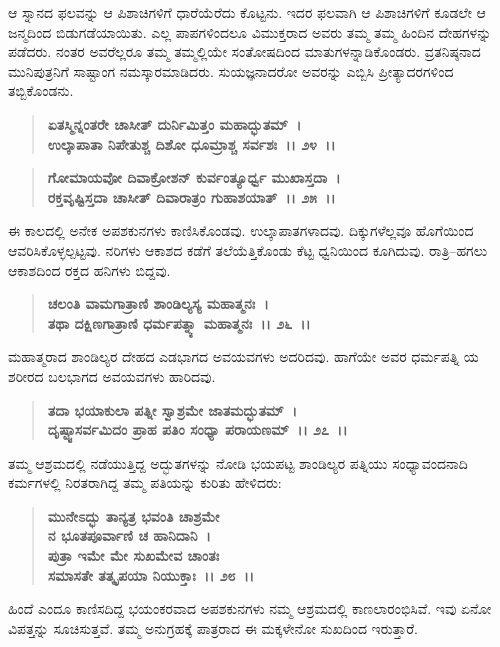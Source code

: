 ಆ ಸ್ನಾನದ ಫಲವನ್ನು ಆ ಪಿಶಾಚಿಗಳಿಗೆ ಧಾರೆಯೆರೆದು ಕೊಟ್ಟನು. ಇದರ ಫಲವಾಗಿ ಆ ಪಿಶಾಚಿಗಳಿಗೆ ಕೂಡಲೇ ಆ ಜನ್ಮದಿಂದ ಬಿಡುಗಡೆಯಾಯಿತು. ಎಲ್ಲ ಪಾಪಗಳಿಂದಲೂ ವಿಮುಕ್ತರಾದ ಅವರು ತಮ್ಮ ತಮ್ಮ ಹಿಂದಿನ ದೇಹಗಳನ್ನು ಪಡೆದರು. ನಂತರ ಅವರೆಲ್ಲರೂ ತಮ್ಮ ತಮ್ಮಲ್ಲಿಯೇ ಸಂತೋಷದಿಂದ ಮಾತುಗಳನ್ನಾಡಿಕೊಂಡರು. ವ್ರತನಿಷ್ಠನಾದ ಮುನಿಪುತ್ರನಿಗೆ ಸಾಷ್ಟಾಂಗ ನಮಸ್ಕಾರಮಾಡಿದರು. ಸುಯಜ್ಞನಾದರೋ ಅವರನ್ನು ಎಬ್ಬಿಸಿ ಪ್ರೀತ್ಯಾದರಗಳಿಂದ ತಬ್ಬಿಕೊಂಡನು.

\begin{verse}
\textbf{ಏತಸ್ಮಿನ್ನಂತರೇ ಚಾಸೀತ್ ದುರ್ನಿಮಿತ್ತಂ ಮಹಾದ್ಭುತಮ್~।}\\\textbf{ಉಲ್ಕಾಪಾತಾ ನಿಪೇತುಶ್ಚ ದಿಶೋ ಧೂಮ್ರಾಶ್ಚ ಸರ್ವಶಃ~।। ೨೪~।। }
\end{verse}

\begin{verse}
\textbf{ಗೋಮಾಯವೋ ದಿವಾಕ್ರೋಶನ್ ಕುರ್ವಂತ್ಯೂರ್ಧ್ವ ಮುಖಾಸ್ತದಾ~।}\\\textbf{ರಕ್ತವೃಷ್ಟಿಸ್ತದಾ ಚಾಸೀತ್ ದಿವಾರಾತ್ರಂ ಗುಹಾಶಯಾತ್~।। ೨೫~।।}
\end{verse}

ಈ ಕಾಲದಲ್ಲಿ ಅನೇಕ ಅಪಶಕುನಗಳು ಕಾಣಿಸಿಕೊಂಡವು. ಉಲ್ಕಾಪಾತಗಳಾದವು. ದಿಕ್ಕುಗಳೆಲ್ಲವೂ ಹೊಗೆಯಿಂದ ಆವರಿಸಿಕೊಳ್ಳಲ್ಪಟ್ಟವು. ನರಿಗಳು ಆಕಾಶದ ಕಡೆಗೆ ತಲೆಯೆತ್ತಿಕೊಂಡು ಕೆಟ್ಟ ಧ್ವನಿಯಿಂದ ಕೂಗಿದುವು. ರಾತ್ರಿ–ಹಗಲು ಆಕಾಶದಿಂದ ರಕ್ತದ ಹನಿಗಳು ಬಿದ್ದವು.

\begin{verse}
\textbf{ಚಲಂತಿ ವಾಮಗಾತ್ರಾಣಿ ಶಾಂಡಿಲ್ಯಸ್ಯ ಮಹಾತ್ಮನಃ~।}\\\textbf{ತಥಾ ದಕ್ಷಿಣಗಾತ್ರಾಣಿ ಧರ್ಮಪತ್ನ್ಯಾ ಮಹಾತ್ಮನಃ~।। ೨೬~।।}
\end{verse}

ಮಹಾತ್ಮರಾದ ಶಾಂಡಿಲ್ಯರ ದೇಹದ ಎಡಭಾಗದ ಅವಯವಗಳು ಅದರಿದವು. ಹಾಗೆಯೇ ಅವರ ಧರ್ಮಪತ್ನಿ ಯ ಶರೀರದ ಬಲಭಾಗದ ಅವಯವಗಳು ಹಾರಿದವು.

\begin{verse}
\textbf{ತದಾ ಭಯಾಕುಲಾ ಪತ್ನೀ ಸ್ವಾಶ್ರಮೇ ಜಾತಮದ್ಭುತಮ್~।}\\\textbf{ದೃಷ್ಟ್ವಾಸರ್ವಮಿದಂ ಪ್ರಾಹ ಪತಿಂ ಸಂಧ್ಯಾ ಪರಾಯಣಮ್~।। ೨೭~।।}
\end{verse}

ತಮ್ಮ ಆಶ್ರಮದಲ್ಲಿ ನಡೆಯುತ್ತಿದ್ದ ಅದ್ಭುತಗಳನ್ನು ನೋಡಿ ಭಯಪಟ್ಟ ಶಾಂಡಿಲ್ಯರ ಪತ್ನಿಯು ಸಂಧ್ಯಾವಂದನಾದಿ ಕರ್ಮಗಳಲ್ಲಿ ನಿರತರಾಗಿದ್ದ ತಮ್ಮ ಪತಿಯನ್ನು ಕುರಿತು ಹೇಳಿದರು:

\begin{verse}
\textbf{ಮುನೇಽದ್ಭು ತಾನ್ಯತ್ರ ಭವಂತಿ ಚಾಶ್ರಮೇ}\\\textbf{ನ ಭೂತಪೂರ್ವಾಣಿ ಚ ಹಾನಿದಾನಿ~।}\\\textbf{ಪುತ್ರಾ ಇಮೇ ಮೇ ಸುಖಮೇವ ಚಾಂತಃ} \\\textbf{ಸಮಾಸತೇ ತತ್ಕೃಪಯಾ ನಿಯುಕ್ತಾಃ~।। ೨೮~।।}
\end{verse}

ಹಿಂದೆ ಎಂದೂ ಕಾಣಿಸದಿದ್ದ ಭಯಂಕರವಾದ ಅಪಶಕುನಗಳು ನಮ್ಮ ಆಶ್ರಮದಲ್ಲಿ ಕಾಣಲಾರಂಭಿಸಿವೆ. ಇವು ಏನೋ ವಿಪತ್ತನ್ನು ಸೂಚಿಸುತ್ತವೆ. ತಮ್ಮ ಅನುಗ್ರಹಕ್ಕೆ ಪಾತ್ರರಾದ ಈ ಮಕ್ಕಳೇನೋ ಸುಖದಿಂದ ಇರುತ್ತಾರೆ.


